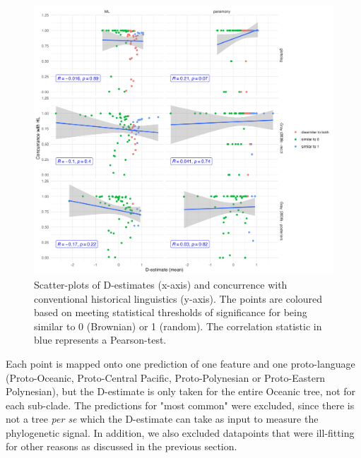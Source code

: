 \documentclass[12pt,letterpaper]{article}
\begin{document}
\begin{figure}[ht]
\centering
\includegraphics[width=18cm]{illustrations/plots_from_R/phylo_d_vs_HL_concurrance.png}
\caption{Scatter-plots of D-estimates (x-axis) and concurrence with conventional historical linguistics (y-axis). The points are coloured based on meeting statistical thresholds of significance for being similar to 0 (Brownian) or 1 (random). The correlation statistic in blue represents a Pearson-test.}
\label{fig:phylo_d_plot_vs_concurrence}
\end{figure}

Each point is mapped onto one prediction of one feature and one proto-language (Proto-Oceanic, Proto-Central Pacific, Proto-Polynesian or Proto-Eastern Polynesian), but the D-estimate is only taken for the entire Oceanic tree, not for each sub-clade. The predictions for "most common" were excluded, since there is not a tree \emph{per se} which the D-estimate can take as input to measure the phylogenetic signal. In addition, we also excluded datapoints that were ill-fitting for other reasons as discussed in the previous section.

\FloatBarrier
\end{document}
